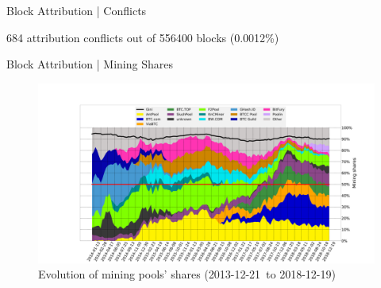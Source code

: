 \documentclass[10pt]{beamer}
\def\stackplotStart{2013-12-21}
\def\stackplotEnd{2018-12-19}
\begin{document}
\begin{frame}[fragile]{Block Attribution | Conflicts}
    \setlength{\tabcolsep}{2pt}
    \begin{table}
        684 attribution conflicts out of 556400 blocks (0.0012\%)
    \end{table}
\end{frame}

\begin{frame}[fragile]{Block Attribution | Mining Shares}
        \vspace*{-0.77cm}
        \begin{figure}
            \hspace*{-1.7cm}
            \includegraphics[width=1.23\textwidth]{images/stackplot_periodLen_2016secs_end_554399_numPeriods_138_threshold_4_groupBy_miner.pdf}
            \\Evolution of mining pools' shares (\stackplotStart~to \stackplotEnd)
        \end{figure}
\end{frame}
\end{document}
